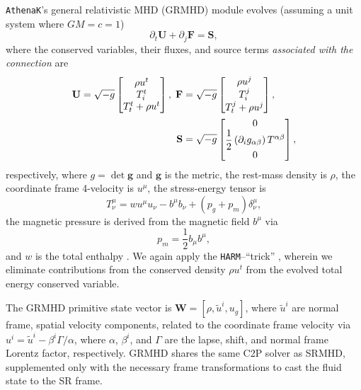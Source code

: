 \documentclass[twocolumn, floatfix]{aastex63}
\begin{document}
\texttt{AthenaK}'s general relativistic MHD (GRMHD) module evolves (assuming a unit system where $GM = c = 1$)
\begin{equation}
    \partial_t \mathbf{U} + \partial_j \mathbf{F} = \mathbf{S},
\label{eq:grmhd_einstein}
\end{equation}
where the conserved variables, their fluxes, and source terms \textit{associated with the connection} are
\begin{align}
\nonumber
{\bf U} = \sqrt{-g} \begin{bmatrix}
           \rho u^t \\
           T^t_i \\
           T^t_t + \rho u^t
         \end{bmatrix},
\hspace*{0.1cm}{\bf F} &= \sqrt{-g} \begin{bmatrix}
           \rho u^j \\
           T^j_i \\
           T^j_t + \rho u^j
         \end{bmatrix},
         \\
{\bf S} &= \sqrt{-g} \begin{bmatrix}
           0 \\
           \dfrac{1}{2} \left( \partial_i g_{\alpha \beta} \right) T^{\alpha \beta} \\
           0
         \end{bmatrix},
\label{eq:grmhd_vars}
\end{align}
respectively, where $g = \det {\mathbf{g}}$ and $\mathbf{g}$ is the metric, the rest-mass density is $\rho$, the coordinate frame 4-velocity is $u^\mu$, the stress-energy tensor is
\begin{equation}
T^\mu_\nu = w u^\mu u_\nu - b^\mu b_\nu + (p_g + p_m) \delta^\mu_\nu,
\end{equation}
the magnetic pressure is derived from the magnetic field $b^\mu$ via
\begin{equation}
    p_m = \frac{1}{2} b_\mu b^{\mu},
\end{equation}
and $w$ is the total enthalpy \citep{2003ApJ...589..444G, WhiteStone2016, Stone2020ApJS..249....4S}.  We again apply the \texttt{HARM}--``trick'' \citep{2003ApJ...589..444G}, wherein we eliminate contributions from the conserved density $\rho u^t$ from the evolved total energy conserved variable.

The GRMHD primitive state vector is $\mathbf{W} = \left [ \rho, \tilde{u}^i, u_g \right]$, where $\tilde{u}^i$ are normal frame, spatial velocity components, related to the coordinate frame velocity via $u^i = \tilde{u}^i - \beta^i \Gamma / \alpha$, where $\alpha$, $\beta^i$, and $\Gamma$ are the lapse, shift, and normal frame Lorentz factor, respectively.  GRMHD shares the same \cite{2021PhRvD.103b3018K} C2P solver as SRMHD, supplemented only with the necessary frame transformations to cast the fluid state to the SR frame.  
\end{document}
